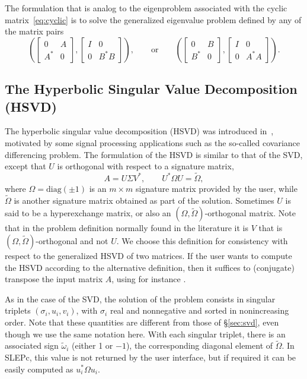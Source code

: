 The formulation that is analog to the eigenproblem associated with the cyclic matrix~\eqref{eq:cyclic} is to solve the generalized eigenvalue problem defined by any of the matrix pairs
\begin{equation}
\label{eq:gsvdeigcyclic}
\left(
\begin{bmatrix}0&A\\A^*&0\end{bmatrix},
\begin{bmatrix}I&0\\0&B^*B\end{bmatrix}
\right),
\qquad\text{or}\qquad
\left(
\begin{bmatrix}0&B\\B^*&0\end{bmatrix},
\begin{bmatrix}I&0\\0&A^*A\end{bmatrix}
\right).
\end{equation}

\subsection{\label{sec:hsvd}The Hyperbolic Singular Value Decomposition (HSVD)}

The hyperbolic singular value decomposition (HSVD) was introduced in~\citep{Onn:1991:HSV}, motivated by some signal processing applications such as the so-called covariance differencing problem. The formulation of the HSVD is similar to that of the SVD, except that $U$ is orthogonal with respect to a signature matrix,
\begin{equation}
\label{eq:hsvd}
A=U\Sigma V^*,\qquad U^*\Omega U=\tilde\Omega,
\end{equation}
where $\Omega=\mathrm{diag}(\pm 1)$ is an $m\times m$ signature matrix provided by the user, while $\tilde\Omega$ is another signature matrix obtained as part of the solution. Sometimes $U$ is said to be a hyperexchange matrix, or also an $(\Omega,\tilde\Omega)$-orthogonal matrix. Note that in the problem definition normally found in the literature it is $V$ that is $(\Omega,\tilde\Omega)$-orthogonal and not $U$. We choose this definition for consistency with respect to the generalized HSVD of two matrices. If the user wants to compute the HSVD according to the alternative definition, then it suffices to (conjugate) transpose the input matrix $A$, using for instance .

As in the case of the SVD, the solution of the problem consists in singular triplets $(\sigma_i,u_i,v_i)$, with $\sigma_i$ real and nonnegative and sorted in nonincreasing order. Note that these quantities are different from those of \S\ref{sec:svd}, even though we use the same notation here. With each singular triplet, there is an associated sign $\tilde\omega_i$ (either 1 or $-1$), the corresponding diagonal element of $\tilde\Omega$. In SLEPc, this value is not returned by the user interface, but if required it can be easily computed as $u_i^*\Omega u_i$.

